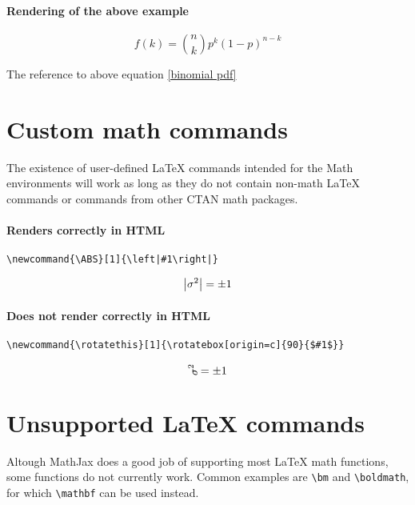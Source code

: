 \paragraph{Rendering of the above example}
\begin{equation}\label{binomial pdf}
  f\left(k\right) = \binom{n}{k} p^k\left(1-p\right)^{n-k}
\end{equation}

The reference to above equation \eqref{binomial pdf}



\section{Custom math commands}

The existence of user-defined LaTeX commands intended for the Math environments will work as long as they do not contain non-math LaTeX commands or commands from other CTAN math packages.

\paragraph{Renders correctly in HTML}

\begin{verbatim}
\newcommand{\ABS}[1]{\left|#1\right|}
\end{verbatim}

$$ \ABS{\sigma^2} = \pm 1 $$

\paragraph{Does not render correctly in HTML}


\begin{verbatim}
\newcommand{\rotatethis}[1]{\rotatebox[origin=c]{90}{$#1$}}
\end{verbatim}

$$ \rotatethis{\sigma^2} = \pm 1 $$



\section{Unsupported LaTeX commands}

Altough MathJax does a good job of supporting most LaTeX math functions,
some functions do not currently work. Common examples are \verb|\bm| and \verb|\boldmath|, for which \verb|\mathbf| can be used instead.





